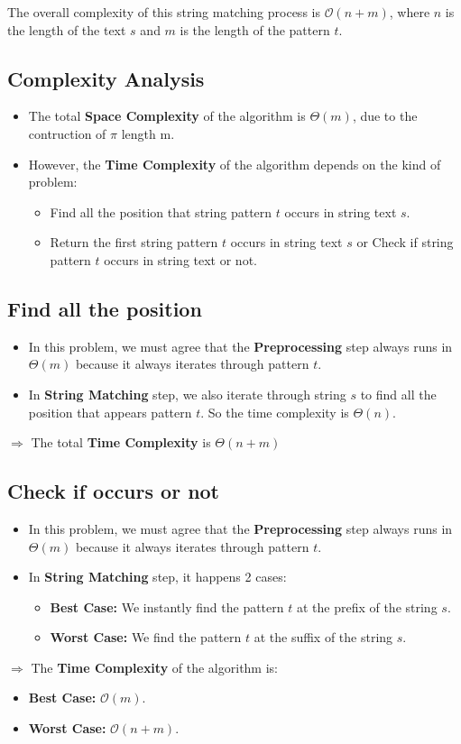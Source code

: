The overall complexity of this string matching process is \( \mathcal{O}(n + m) \), where \( n \) is the length of the text \( s \) and \( m \) is the length of the pattern \( t \).

\subsection{Complexity Analysis}
\begin{itemize}
    \item The total \textbf{Space Complexity} of the algorithm is $\Theta(m)$, due to the contruction of $\pi$ length m.
    \item However, the \textbf{Time Complexity} of the algorithm depends on the kind of problem:
    \begin{itemize}
        \item Find all the position that string pattern $t$ occurs in string text $s$.
        \item Return the first string pattern $t$ occurs in string text $s$ or Check if string pattern $t$ occurs in string text or not.
    \end{itemize}
\end{itemize}
\subsection*{Find all the position}
\begin{itemize}
    \item In this problem, we must agree that the \textbf{Preprocessing} step always runs in $\Theta(m)$ because it always iterates through pattern $t$.
    \item In \textbf{String Matching} step, we also iterate through string $s$ to find all the position that appears pattern $t$. So the time complexity is $\Theta(n)$.
\end{itemize}
$\Longrightarrow$ The total \textbf{Time Complexity} is $\Theta(n + m)$
\subsection*{Check if occurs or not}
\begin{itemize}
    \item In this problem, we must agree that the \textbf{Preprocessing} step always runs in $\Theta(m)$ because it always iterates through pattern $t$.
    \item In \textbf{String Matching} step, it happens 2 cases:
    \begin{itemize}
        \item \textbf{Best Case:} We instantly find the pattern $t$ at the prefix of the string $s$.
        \item \textbf{Worst Case:} We find the pattern $t$ at the suffix of the string $s$.
    \end{itemize}
\end{itemize}
$\Longrightarrow$ The \textbf{Time Complexity} of the algorithm is:
\begin{itemize}
    \item \textbf{Best Case:} $\mathcal{O}(m)$.
    \item \textbf{Worst Case: } $\mathcal{O}(n + m)$.
\end{itemize}